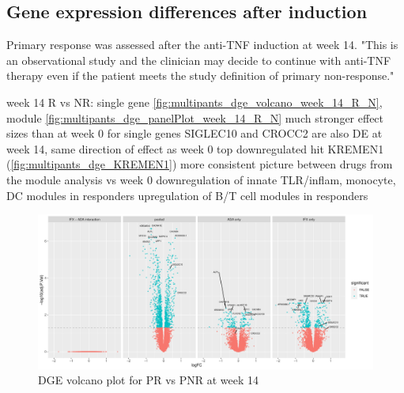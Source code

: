 \begin{outline}


\subsection{Gene expression differences after  induction}

Primary response was assessed after the \gls{anti-TNF} induction at week 14.
"This is an observational study and the clinician may decide to continue with anti-TNF therapy even if the patient meets the study definition of primary non-response."

\1 week 14 R vs NR: single gene \autoref{fig:multipants_dge_volcano_week_14_R_N}, module \autoref{fig:multipants_dge_panelPlot_week_14_R_N}
    \2 much stronger effect sizes than at week 0 for single genes
        \3 SIGLEC10 and CROCC2 are also DE at week 14, same direction of effect as week 0
        \3 top downregulated hit KREMEN1 (\autoref{fig:multipants_dge_KREMEN1}) 
    \2 more consistent picture between drugs from the module analysis vs week 0
        \3 downregulation of innate TLR/inflam, monocyte, DC modules in responders
        \3 upregulation of B/T cell modules in responders

\begin{figure}
    \centering
    \includegraphics[width=1.0\textwidth,page=1]{mainmatter/figures/chapter_04/plot_gene_set_enrichment.dge_result_volcano_C_3RI_3NI,C_3RA_3NA,C_(3RI_3NI)_(3RA_3NA),C_3R_3N.pdf}
    \caption{DGE volcano plot for PR vs PNR at week 14}
    \label{fig:multipants_dge_volcano_week_14_R_N}
\end{figure}


\end{outline}
